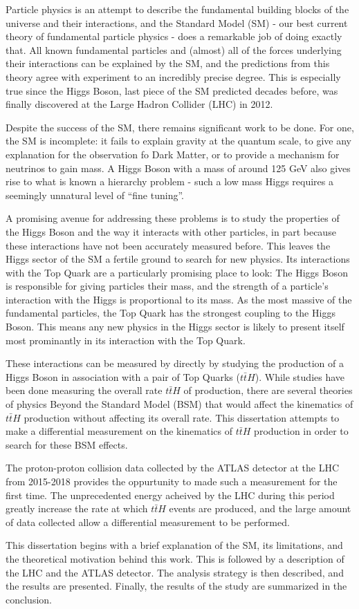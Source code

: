 Particle physics is an attempt to describe the fundamental building blocks of the universe and their interactions, and the Standard Model (SM) - our best current theory of fundamental particle physics - does a remarkable job of doing exactly that. All known fundamental particles and (almost) all of the forces underlying their interactions can be explained by the SM, and the predictions from this theory agree with experiment to an incredibly precise degree. This is especially true since the Higgs Boson, last piece of the SM predicted decades before, was finally discovered at the Large Hadron Collider (LHC) in 2012. 

Despite the success of the SM, there remains significant work to be done. For one, the SM is incomplete: it fails to explain gravity at the quantum scale, to give any explanation for the observation fo Dark Matter, or to provide a mechanism for neutrinos to gain mass. A Higgs Boson with a mass of around 125 GeV also gives rise to what is known a hierarchy problem - such a low mass Higgs requires a seemingly unnatural level of ``fine tuning''. 

A promising avenue for addressing these problems is to study the properties of the Higgs Boson and the way it interacts with other particles, in part because these interactions have not been accurately measured before. This leaves the Higgs sector of the SM a fertile ground to search for new physics. Its interactions with the Top Quark are a particularly promising place to look: The Higgs Boson is responsible for giving particles their mass, and the strength of a particle's interaction with the Higgs is proportional to its mass. As the most massive of the fundamental particles, the Top Quark has the strongest coupling to the Higgs Boson. This means any new physics in the Higgs sector is likely to present itself most prominantly in its interaction with the Top Quark.

These interactions can be measured by directly by studying the production of a Higgs Boson in association with a pair of Top Quarks ($t\bar{t}H$). While studies have been done measuring the overall rate $t\bar{t}H$ of production, there are several theories of physics Beyond the Standard Model (BSM) that would affect the kinematics of $t\bar{t}H$ production without affecting its overall rate. This dissertation attempts to make a differential measurement on the kinematics of $t\bar{t}H$ production in order to search for these BSM effects.

The proton-proton collision data collected by the ATLAS detector at the LHC from 2015-2018 provides the oppurtunity to made such a measurement for the first time. The unprecedented energy acheived by the LHC during this period greatly increase the rate at which $t\bar{t}H$ events are produced, and the large amount of data collected allow a differential measurement to be performed.

This dissertation begins with a brief explanation of the SM, its limitations, and the theoretical motivation behind this work. This is followed by a description of the LHC and the ATLAS detector. The analysis strategy is then described, and the results are presented. Finally, the results of the study are summarized in the conclusion.

